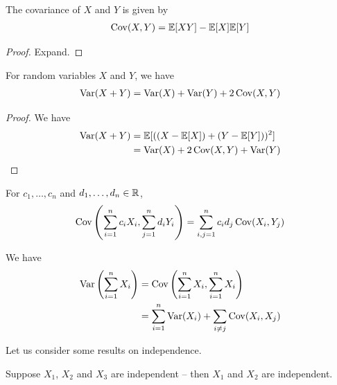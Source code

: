 \documentclass{../../template/note}
\begin{document}
    \begin{lemma}
        The covariance of \(X\) and \(Y\) is given by
        \begin{align*}
            \operatorname{Cov}(X, Y) = \mathbb E[XY] - \mathbb E[X]\mathbb E[Y]
        \end{align*}
    \end{lemma}
    
    \begin{proof}
        Expand.
    \end{proof}

    \begin{lemma}
        For random variables \(X\) and \(Y\), we have
        \begin{align*}
            \operatorname{Var}(X+Y) = \operatorname{Var}(X) + \operatorname{Var}(Y) + 2\operatorname{Cov}(X, Y)
        \end{align*}
    \end{lemma}
    
    \begin{proof}
        We have
        \begin{align*}
            \operatorname{Var}(X + Y) &= \mathbb E[((X-\mathbb E[X])+(Y-\mathbb E[Y]))^2] \\
            &= \operatorname{Var}(X) + 2\operatorname{Cov}(X, Y) + \operatorname{Var}(Y)
        \end{align*}
    \end{proof}
    
    \begin{lemma}
        For \(c_1, \dots, c_n\) and \(d_1, \dots, d_n \in \mathbb R\),
        \begin{align*}
            \operatorname{Cov}\left(\sum_{i=1}^n c_iX_i, \sum_{j=1}^n d_iY_i\right) = \sum_{i,j=1}^n c_id_j \operatorname{Cov}(X_i, Y_j)
        \end{align*}
    \end{lemma}
    
    \begin{corollary}
        We have
        \begin{align*}
            \operatorname{Var}\left(\sum_{i=1}^n X_i\right) &= \operatorname{Cov}\left(\sum_{i=1}^n X_i, \sum_{i=1}^n X_i\right) \\
            &= \sum_{i=1}^n \operatorname{Var}(X_i) + \sum_{i \neq j}\operatorname{Cov}(X_i, X_j)
        \end{align*}
    \end{corollary}
    
    Let us consider some results on independence.

    \begin{lemma}
        Suppose \(X_1\), \(X_2\) and \(X_3\) are independent -- then \(X_1\) and \(X_2\) are independent.
    \end{lemma}
\end{document}
